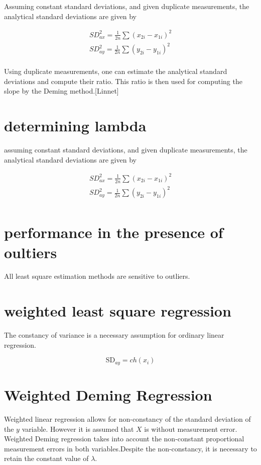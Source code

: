 \documentclass[12pt, a4paper]{report}
\theoremstyle{plain}
\theoremstyle{definition}
\theoremstyle{remark}
\begin{document}
Assuming constant standard deviations, and given duplicate measurements, the analytical standard deviations are given by

\begin{eqnarray*}
	SD^{2}_{ax} = \frac{1}{2n} \sum (x_{2i} - x_{1i})^{2}\\
	SD^{2}_{ay} = \frac{1}{2n} \sum (y_{2i} - y_{1i})^{2}\\
\end{eqnarray*}

Using duplicate measurements, one can estimate the analytical
standard deviations and compute their ratio. This ratio is then
used for computing the slope by the Deming method.[Linnet]

\section{determining lambda}
assuming constant standard deviations, and given duplicate
measurements, the analytical standard deviations are given by

\begin{eqnarray*}
	SD^{2}_{ax} = \frac{1}{2n} \sum (x_{2i} - x_{1i})^{2}\\
	SD^{2}_{ay} = \frac{1}{2n} \sum (y_{2i} - y_{1i})^{2}\\
\end{eqnarray*}

\section{performance in the presence of oultiers}
All least square estimation methods are sensitive to outliers.

\section{weighted least square regression}
The constancy of variance is a necessary assumption for ordinary
linear regression.

\begin{equation}
	\mbox{SD}_{ay}  = ch(x_{i})
\end{equation}

\section{Weighted Deming Regression}

Weighted linear regression allows for non-constancy of the standard deviation of the $y$ variable. However it is assumed that $X$ is without measurement error. Weighted Deming regression takes into account the non-constant proportional measurement errors in both variables.Despite the non-constancy, it is necessary to retain the constant value of $\lambda$.
\end{document}
